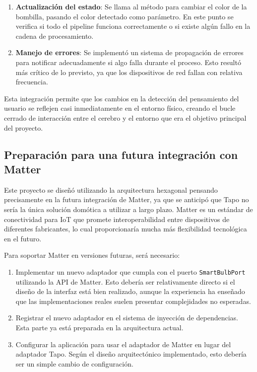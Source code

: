 \begin{enumerate}
\begin{enumerate}
    \item \textbf{Actualización del estado}: Se llama al método para cambiar el color de la bombilla, pasando el color detectado como parámetro. En este punto se verifica si todo el pipeline funciona correctamente o si existe algún fallo en la cadena de procesamiento.
    
    \item \textbf{Manejo de errores}: Se implementó un sistema de propagación de errores para notificar adecuadamente si algo falla durante el proceso. Esto resultó más crítico de lo previsto, ya que los dispositivos de red fallan con relativa frecuencia.
\end{enumerate}

Esta integración permite que los cambios en la detección del pensamiento del usuario se reflejen casi inmediatamente en el entorno físico, creando el bucle cerrado de interacción entre el cerebro y el entorno que era el objetivo principal del proyecto.

\newpage
\subsection{Preparación para una futura integración con Matter}

Este proyecto se diseñó utilizando la arquitectura hexagonal pensando precisamente en la futura integración de Matter, ya que se anticipó que Tapo no sería la única solución domótica a utilizar a largo plazo. Matter es un estándar de conectividad para IoT que promete interoperabilidad entre dispositivos de diferentes fabricantes, lo cual proporcionaría mucha más flexibilidad tecnológica en el futuro.

Para soportar Matter en versiones futuras, será necesario:

\begin{enumerate}
    \item Implementar un nuevo adaptador que cumpla con el puerto \texttt{SmartBulbPort} utilizando la API de Matter. Esto debería ser relativamente directo si el diseño de la interfaz está bien realizado, aunque la experiencia ha enseñado que las implementaciones reales suelen presentar complejidades no esperadas.
    \item Registrar el nuevo adaptador en el sistema de inyección de dependencias. Esta parte ya está preparada en la arquitectura actual.
    \item Configurar la aplicación para usar el adaptador de Matter en lugar del adaptador Tapo. Según el diseño arquitectónico implementado, esto debería ser un simple cambio de configuración.
\end{enumerate}


\end{enumerate}
